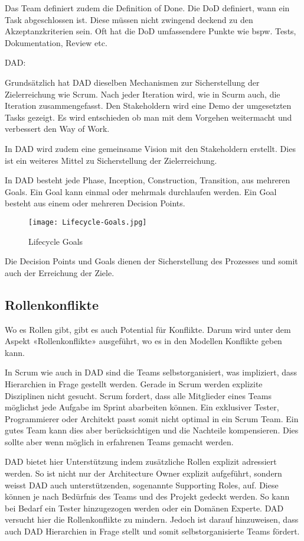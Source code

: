 Das Team definiert zudem die Definition of Done. Die DoD definiert, wann ein Task abgeschlossen ist. Diese müssen nicht zwingend deckend zu den Akzeptanzkriterien sein. Oft hat die DoD umfassendere Punkte wie bspw. Tests, Dokumentation, Review etc.

\medskip
{\Large DAD:} \medskip

Grundsätzlich hat DAD dieselben Mechanismen zur Sicherstellung der Zielerreichung wie Scrum. Nach jeder Iteration wird, wie in Scurm auch, die Iteration zusammengefasst. Den Stakeholdern wird eine Demo der umgesetzten Tasks gezeigt. Es wird entschieden ob man mit dem Vorgehen weitermacht und verbessert den Way of Work.

In DAD wird zudem eine gemeinsame Vision mit den Stakeholdern erstellt. Dies ist ein weiteres Mittel zu Sicherstellung der Zielerreichung.

In DAD besteht jede Phase, Inception, Construction, Transition, aus mehreren Goals. Ein Goal kann einmal oder mehrmals durchlaufen werden. Ein Goal besteht aus einem oder mehreren Decision Points.

\begin{figure}[H]
	\centering
	\texttt{[image: Lifecycle-Goals.jpg]}
	\caption{Lifecycle Goals}
	\label{fig:goals}
\end{figure}

Die Decision Points und Goals dienen der Sicherstellung des Prozesses und somit auch der Erreichung der Ziele.

\subsection{Rollenkonflikte}

Wo es Rollen gibt, gibt es auch Potential für Konflikte. Darum wird unter dem Aspekt «Rollenkonflikte» ausgeführt, wo es in den Modellen Konflikte geben kann.

In Scrum wie auch in DAD sind die Teams selbstorganisiert, was impliziert, dass Hierarchien in Frage gestellt werden. Gerade in Scrum werden explizite Disziplinen nicht gesucht. Scrum fordert, dass alle Mitglieder eines Teams möglichst jede Aufgabe im Sprint abarbeiten können. Ein exklusiver Tester, Programmierer oder Architekt passt somit nicht optimal in ein Scrum Team. Ein gutes Team kann dies aber berücksichtigen und die Nachteile kompensieren. Dies sollte aber wenn möglich in erfahrenen Teams gemacht werden.

DAD bietet hier Unterstützung indem zusätzliche Rollen explizit adressiert werden. So ist nicht nur der Architecture Owner explizit aufgeführt, sondern weisst DAD auch unterstützenden, sogenannte Supporting Roles, auf. Diese können je nach Bedürfnis des Teams und des Projekt gedeckt werden. So kann bei Bedarf ein Tester hinzugezogen werden oder ein Domänen Experte. DAD versucht hier die Rollenkonflikte zu mindern. Jedoch ist darauf hinzuweisen, dass auch DAD Hierarchien in Frage stellt und somit selbstorganisierte Teams fördert.



